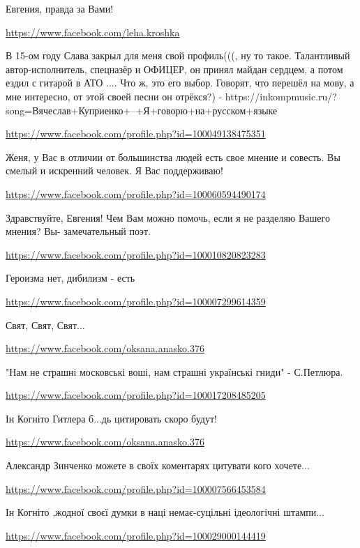 \documentclass[a4paper,11pt]{extreport}
\begin{document}
\begin{itemize}
Евгения, правда за Вами!

\url{https://www.facebook.com/leha.kroshka}

В 15-ом году Слава закрыл для меня свой профиль(((, ну то такое. Талантливый автор-исполнитель, спецназёр и ОФИЦЕР, он принял майдан сердцем, а потом ездил с гитарой в АТО .... Что ж, это его выбор. Говорят, что перешёл на мову, а мне интересно, от этой своей песни он отрёкся?) - https://inkompmusic.ru/?song=Вячеслав+Куприенко+–+Я+говорю+на+русском+языке

\url{https://www.facebook.com/profile.php?id=100049138475351}

Женя, у Вас в отличии от большинства людей есть свое мнение и совесть. Вы смелый и искренний человек. Я Вас поддерживаю!

\url{https://www.facebook.com/profile.php?id=100060594490174}

Здравствуйте, Евгения! Чем Вам можно помочь, если я не разделяю Вашего мнения?
Вы- замечательный поэт.

\url{https://www.facebook.com/profile.php?id=100010820823283}

Героизма нет, дибилизм - есть

\url{https://www.facebook.com/profile.php?id=100007299614359}

Свят, Свят, Свят...

\url{https://www.facebook.com/oksana.anasko.376}

"Нам не страшні московські воші, нам страшні українські гниди" - С.Петлюра.

\begin{itemize}
\url{https://www.facebook.com/profile.php?id=100017208485205}

Ін Когніто Гитлера б...дь цитировать скоро будут!🤦‍♂️🤦‍♂️🤦‍♂️

\url{https://www.facebook.com/oksana.anasko.376}

Александр Зинченко можете в своїх коментарях цитувати кого хочете...

\url{https://www.facebook.com/profile.php?id=100007566453584}

Ін Когніто ,жодної своєї думки в наці немає-суцільні ідеологічні штампи...

\end{itemize}
\url{https://www.facebook.com/profile.php?id=100029000144419}


\end{itemize}
\end{document}
